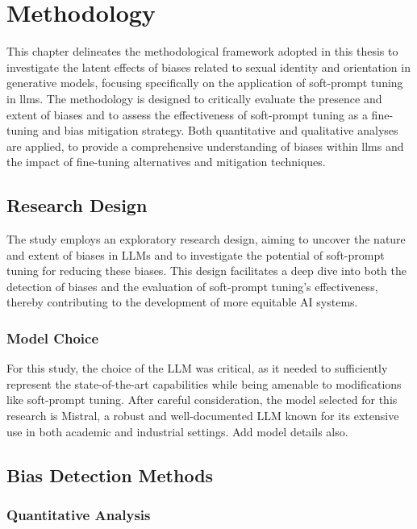 \chapter{Methodology}

This chapter delineates the methodological framework adopted in this thesis to investigate the latent effects of biases related to sexual identity and orientation in generative models, focusing specifically on the application of soft-prompt tuning in \acrshort{llms}. The methodology is designed to critically evaluate the presence and extent of biases and to assess the effectiveness of soft-prompt tuning as a fine-tuning and bias mitigation strategy. Both quantitative and qualitative analyses are applied, to provide a comprehensive understanding of biases within \acrshort{llms} and the impact of fine-tuning alternatives and mitigation techniques.

\section{Research Design}

The study employs an exploratory research design, aiming to uncover the nature and extent of biases in LLMs and to investigate the potential of soft-prompt tuning for reducing these biases. This design facilitates a deep dive into both the detection of biases and the evaluation of soft-prompt tuning's effectiveness, thereby contributing to the development of more equitable AI systems.

\subsection{Model Choice}
For this study, the choice of the LLM was critical, as it needed to sufficiently represent the state-of-the-art capabilities while being amenable to modifications like soft-prompt tuning. After careful consideration, the model selected for this research is Mistral, a robust and well-documented LLM known for its extensive use in both academic and industrial settings. Add model details also.


\section{Bias Detection Methods}

\subsection{Quantitative Analysis}


